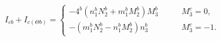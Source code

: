 \begin{equation}
I_{cb} + I_{ c (\Theta b)}  
=\left\{
\begin{array}{ll}
-4^b(n^b_1N^b_2+m^b_1M^b_2)M^b_3 & \qquad M^c_3=0,\\
-(m^b_1N^b_2-n^b_1M^b_2)n^b_3 & \qquad M^c_3=-1.
\end{array}
\right.\label{AppIntersFillerBranes}
\end{equation}

